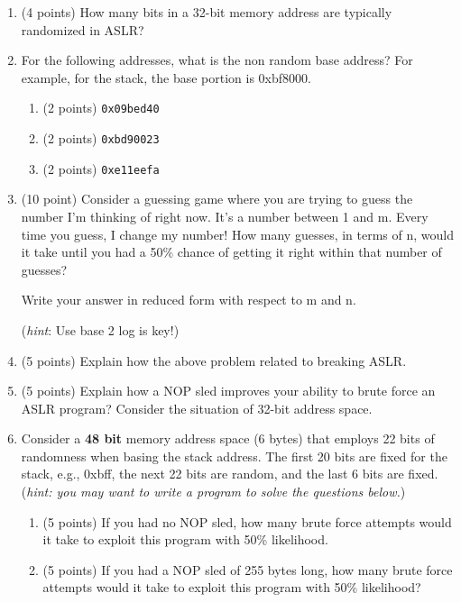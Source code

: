 \documentclass{article}[9pt]
\begin{document}
\begin{enumerate}
\item (4 points) How many bits in a 32-bit memory address are typically randomized
in ASLR?

\item For the following addresses, what is the non random base address?
For example, for the stack, the base portion is 0xbf8000.

\begin{enumerate}
\item (2 points) \texttt{0x09bed40}

\item (2 points) \texttt{0xbd90023}

\item (2 points) \texttt{0xe11eefa}
\end{enumerate}

\item (10 point) Consider a guessing game where you are trying to guess the number
I'm thinking of right now. It's a number between 1 and m. Every
time you guess, I change my number! How many guesses, in terms of
n, would it take until you had a 50\% chance of getting it right
within that number of guesses? 

Write your answer in reduced form with respect to m and n. 

(\emph{hint}: Use base 2 log is key!)

\item (5 points) Explain how the above problem related to breaking ASLR.

\item (5 points) Explain how a NOP sled improves your ability to brute force an
ASLR program? Consider the situation of 32-bit address space.

\item Consider a \textbf{48 bit} memory address space (6 bytes) that employs
22 bits of randomness when basing the stack address. The first 20
bits are fixed for the stack, e.g., 0xbff, the next 22 bits are
random, and the last 6 bits are fixed. (\emph{hint: you may want to
write a program to solve the questions below.})

\begin{enumerate}
\item (5 points) If you had no NOP sled, how many brute force attempts would it
take to exploit this program with 50\% likelihood.

\item (5 points) If you had a NOP sled of 255 bytes long, how many brute force
attempts would it take to exploit this program with 50\%
likelihood?


\end{enumerate}
\end{enumerate}
\end{document}
